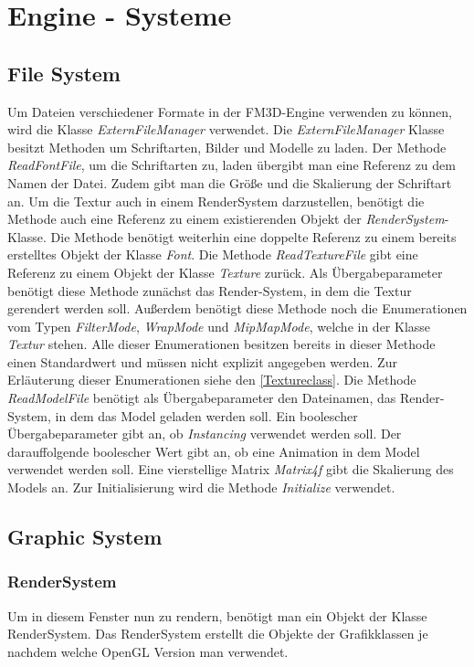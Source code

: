 \section{Engine - Systeme}


\subsection{File System}
Um Dateien verschiedener Formate in der FM3D-Engine verwenden zu können, wird die Klasse \textit{ExternFileManager} verwendet.
Die \textit{ExternFileManager} Klasse besitzt Methoden um Schriftarten, Bilder und Modelle zu laden. Der Methode \textit{ReadFontFile}, um die Schriftarten zu, laden übergibt man eine Referenz zu dem Namen der Datei. Zudem gibt man die Größe und die Skalierung der Schriftart an. Um die Textur auch in einem RenderSystem darzustellen, benötigt die Methode auch eine Referenz zu einem existierenden Objekt der \textit{RenderSystem}-Klasse. Die Methode benötigt weiterhin eine doppelte Referenz zu einem bereits erstelltes Objekt der Klasse \textit{Font}. 
Die Methode \textit{ReadTextureFile} gibt eine Referenz zu einem Objekt der Klasse \textit{Texture} zurück. Als Übergabeparameter benötigt diese Methode zunächst das Render-System, in dem die Textur gerendert werden soll. Außerdem benötigt diese Methode noch  die Enumerationen vom Typen \textit{FilterMode}, \textit{WrapMode} und \textit{MipMapMode}, welche in der Klasse \textit{Textur} stehen. Alle dieser Enumerationen besitzen bereits in dieser Methode einen Standardwert und müssen nicht explizit angegeben werden. Zur Erläuterung dieser Enumerationen siehe den \cref{Textureclass}. 
Die Methode \textit{ReadModelFile} benötigt als Übergabeparameter den Dateinamen, das Render-System, in dem das Model geladen werden soll. Ein boolescher Übergabeparameter gibt an, ob \textit{Instancing} verwendet werden soll. Der darauffolgende boolescher Wert gibt an, ob eine Animation in dem Model verwendet werden soll. Eine vierstellige Matrix \textit{Matrix4f} gibt die Skalierung des Models an.
Zur Initialisierung wird die Methode \textit{Initialize} verwendet.

\subsection{Graphic System}

\subsubsection{RenderSystem}
Um in diesem Fenster nun zu rendern, benötigt man ein Objekt der Klasse RenderSystem. Das RenderSystem erstellt die Objekte der Grafikklassen je nachdem welche OpenGL Version man verwendet.


